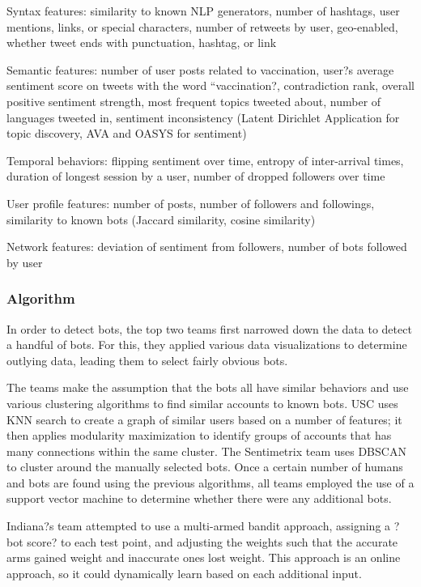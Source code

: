 \documentclass[11pt, oneside]{article}   	%
\begin{document}
Syntax features: similarity to known NLP generators, number of hashtags, user mentions, links, or special characters, number of retweets by user, geo-enabled, whether tweet ends with punctuation, hashtag, or link

Semantic features: number of user posts related to vaccination, user?s average sentiment score on tweets with the word ``vaccination?, contradiction rank, overall positive sentiment strength, most frequent topics tweeted about, number of languages tweeted in, sentiment inconsistency (Latent Dirichlet Application for topic discovery, AVA and OASYS for sentiment)

Temporal behaviors: flipping sentiment over time, entropy of inter-arrival times, duration of longest session by a user, number of dropped followers over time

User profile features: number of posts, number of followers and followings, similarity to known bots (Jaccard similarity, cosine similarity)

Network features: deviation of sentiment from followers, number of bots followed by user

\subsubsection*{Algorithm}

\quad In order to detect bots, the top two teams first narrowed down the data to detect a handful of bots.
For this, they applied various data visualizations to determine outlying data, leading them to select fairly obvious bots.

\quad The teams make the assumption that the bots all have similar behaviors and use various clustering algorithms to find similar accounts to known bots.
USC uses KNN search to create a graph of similar users based on a number of features; it then applies modularity maximization to identify groups of accounts that has many connections within the same cluster.
The Sentimetrix team uses DBSCAN to cluster around the manually selected bots.
Once a certain number of humans and bots are found using the previous algorithms, all teams employed the use of a support vector machine to determine whether there were any additional bots.

\quad Indiana?s team attempted to use a multi-armed bandit approach, assigning a ?bot score? to each test point, and adjusting the weights such that the accurate arms gained weight and inaccurate ones lost weight.
This approach is an online approach, so it could dynamically learn based on each additional input.
\end{document}
